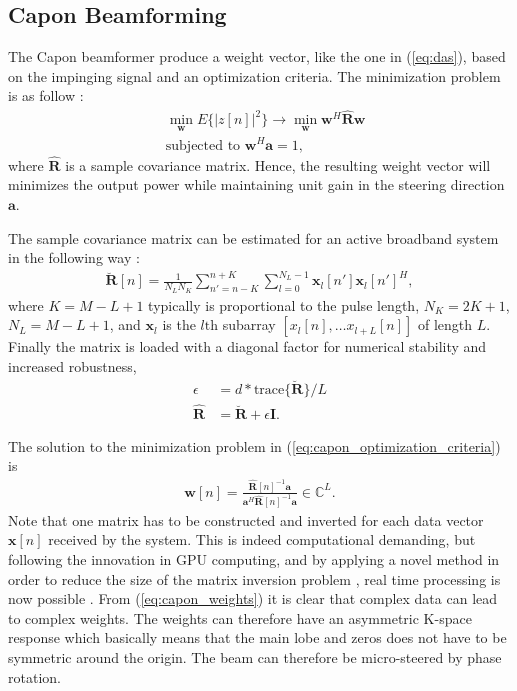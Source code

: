 \documentclass[journal]{IEEEtran}
\newcommand{\mat}[1]{\mathbf{#1}}
\renewcommand{\vec}[1]{\mathbf{#1}}
\begin{document}
\subsection{Capon Beamforming}
The Capon beamformer produce a weight vector, like the one in (\ref{eq:das}), based on the impinging signal and an optimization criteria. The minimization problem is as follow \cite{Capon1969}:
\begin{align}
&\min_{\vec{w}} E\{|z[n]|^2\} \rightarrow \min_{\vec{w}} \vec{w}^H \mat{\hat{R}} \vec{w} \label{eq:capon_optimization_criteria} \\
&\text{subjected to } \vec{w}^H\vec{a} = 1,
\end{align}
where $\mat{\hat{R}}$ is a sample covariance matrix. Hence, the resulting weight vector will minimizes the output power while maintaining unit gain in the steering direction $\vec{a}$. %

The sample covariance matrix can be estimated for an active broadband system in the following way \cite{Synnevag2009}:
\begin{align}
\mat{\breve{R}}[n] = \frac{1}{N_LN_K}\sum_{n'=n-K}^{n+K} \sum_{l=0}^{N_L-1} \vec{x}_l[n']\vec{x}_l[n']^H,
\end{align}
where $K = M-L+1$ typically is proportional to the pulse length, $N_K = 2K + 1$, $N_L = M-L+1$, and $\vec{x}_l$ is the $l\text{th}$ subarray $[x_l[n], \dotso x_{l+L}[n]]$ of length $L$. Finally the matrix is loaded with a diagonal factor for numerical stability and increased robustness, 
\begin{align}
\epsilon &= d*\text{trace}\{\mat{\breve{R}}\}/L\\
\mat{\hat{R}} &= \mat{\breve{R}} + \epsilon\mat{I}.
\end{align} 

The solution to the minimization problem in (\ref{eq:capon_optimization_criteria}) is
\begin{align}\label{eq:capon_weights}
\vec{w}[n] = \frac{\mat{\hat{R}}[n]^{-1}\vec{a}}{\vec{a}^H\mat{\hat{R}}[n]^{-1}\vec{a}} \in \mathbb{C}^L.
\end{align}
Note that one matrix has to be constructed and inverted for each data vector $\vec{x}[n]$ received by the system. This is indeed computational demanding, but following the innovation in GPU computing, and by applying a novel method in order to reduce the size of the matrix inversion problem \cite{Nilsen2009}, real time processing is now possible \cite{Asen}. From (\ref{eq:capon_weights}) it is clear that complex data can lead to complex weights. The weights can therefore have an asymmetric K-space response which basically means that the main lobe and zeros does not have to be symmetric around the origin. The beam can therefore be micro-steered by phase rotation.
\end{document}
